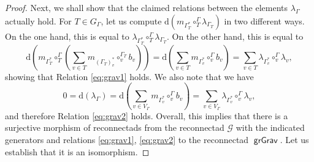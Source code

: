 \documentclass[11pt]{article}
\theoremstyle{definition}
\numberwithin{equation}{section}
\newcommand\calG{\mathcal{G}}
\DeclareMathOperator{\grGrav}{\mathsf{grGrav}}
\begin{document}
\begin{proof}
Next, we shall show that the claimed relations between the elements $\lambda_{\Gamma}$ actually hold. For $T\in G_\Gamma$, let us compute $\mathrm{d}(m_{\Gamma^*_T}\circ_T^{\Gamma} \lambda_{\Gamma_T})$ in two different ways. On the one hand, this is equal to $\lambda_{\Gamma^*_T}\circ_T^{\Gamma} \lambda_{\Gamma_T}$. On the other hand, this is equal to
 \[
\mathrm{d}\left(m_{\Gamma^*_T}\circ_T^{\Gamma} \left(\sum_{v\in T} m_{(\Gamma_T)^*_v}\circ_v^{\Gamma_T} b_v\right)\right)
= \mathrm{d}\left(\sum_{v\in T} m_{\Gamma^*_v}\circ_v^{\Gamma} b_v\right)=\sum_{v \in T} \lambda_{\Gamma^*_v} \circ_v^{\Gamma} \lambda_v,
 \]
showing that Relation \eqref{eq:grav1} holds. We also note that we have
 \[
0=\mathrm{d}(\lambda_{\Gamma})=\mathrm{d}\left(\sum_{v\in V_\Gamma}m_{\Gamma^*_v}\circ_v^{\Gamma} b_v\right)=\sum_{v\in V_\Gamma}\lambda_{\Gamma^*_v}\circ_v^{\Gamma} \lambda_v,
 \] 
and therefore Relation \eqref{eq:grav2} holds. Overall, this implies that there is a surjective morphism of reconnectads from the reconnectad $\calG$ with the indicated generators and relations \eqref{eq:grav1}, \eqref{eq:grav2} to the reconnectad $\grGrav$. Let us establish that it is an isomorphism. 


\end{proof}
\end{document}
